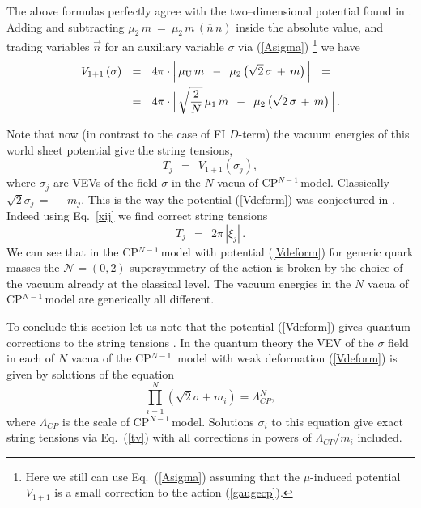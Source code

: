 \documentclass[12pt]{article}
\def\beq{\begin{equation}}
\def\eeq{\end{equation}}
\newcommand{\ntwoo}{${\mathcal N}= \left(0,2\right) $ }
\newcommand{\ov}{\overline}
\newcommand{\nbar}{\ov{n}}
\newcommand{\muU}{\mu_\text{U}}
\newcommand{\cpn}{CP$^{N-1}$\,}
\begin{document}
	The above formulas perfectly agree with the two--dimensional potential found in \cite{Shifman:2010kr}.
	Adding and subtracting $ \mu_2\, m ~=~ \mu_2\, m\, (\nbar\, n) $ inside the absolute value,
	and trading variables $ \vec{n} $ for an auxiliary variable $ \sigma $ via (\ref{Asigma}) \footnote{Here we still can use Eq.~(\ref{Asigma})
	assuming that the $\mu$-induced potential $V_{1+1}$ is a small correction to the action (\ref{gaugecp}).}
	we have
\begin{align}
%
	\notag
	V_{1+1}\, (\sigma)    & ~~=~~    4 \pi \cdot \Big|\, \muU\, m  \,~-~\,  \mu_2\, \big( \sqrt{2}\,\sigma \,+\, m \big) \,\Big|    ~~=~~    
	\\
%
\label{Vdeform}
	& ~~=~~
	4 \pi \cdot \Big|\, \sqrt{\frac{2}{N}}\,\mu_1\, m  \,~-~\,  \mu_2\, \big( \sqrt{2}\,\sigma \,+\, m \big) \,\Big|\,.
\end{align}

	Note that now (in contrast to the case of FI $D$-term)
	the vacuum energies of this world sheet potential give  the string tensions,
\beq
 	T_j    ~~=~~    V_{1+1}(\sigma_j),
\label{tv}
\eeq
	where $\sigma_j $ are VEVs of the field $  \sigma $ in the $ N $ vacua of \cpn model. 
	Classically $ \sqrt{2}\sigma_j \,=\, -m_j $. 
	This is the way the potential (\ref{Vdeform}) was conjectured in \cite{Shifman:2010kr}.
	Indeed using Eq.~\eqref{xij} we find correct string tensions
\beq
	T_j    ~~=~~    2\pi\, |\xi_j |\,.
\eeq
	We can see that in the \cpn model with potential (\ref{Vdeform}) for generic quark masses 
	the \ntwoo supersymmetry of the action is broken by the choice of the vacuum already at the classical level. 
	The vacuum energies in the $ N $ vacua of \cpn model are generically all different.

	To conclude this section let us note that the potential 
	(\ref{Vdeform}) gives quantum corrections to the string tensions
	\cite{Shifman:2010kr}.
	In the quantum theory the VEV of the  $\sigma$ field in each of $N$ vacua of the \cpn
	model with weak deformation (\ref{Vdeform}) is given by
	solutions of the equation \cite{AdDVecSal,ChVa,W93,HaHo}
\beq
	\prod_{i=1}^{N}(\sqrt{2}\sigma +m_i)=\Lambda_{CP}^N,
\eeq
	where $ \Lambda_{CP} $ is the scale of \cpn model. Solutions $  \sigma_i$ to this equation  give exact string tensions
	via Eq.~(\ref{tv}) with all corrections 
	in powers of $ \Lambda_{CP} / m_i $ included.




\end{document}
